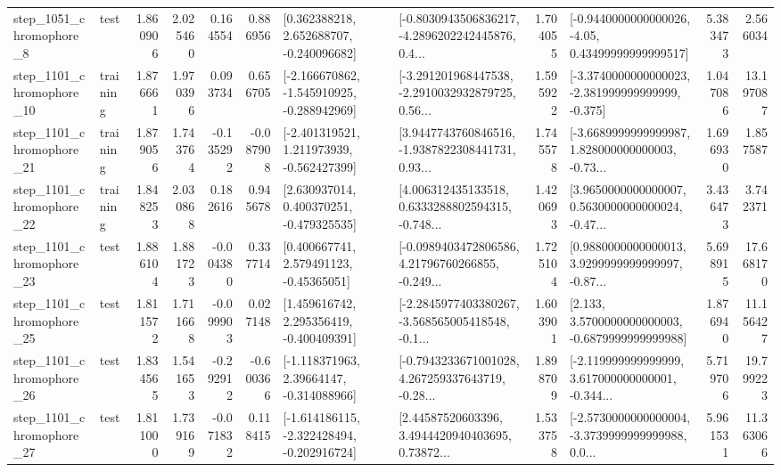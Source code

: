 \begin{tabular}{llrrrrllrlrr}
  step\_1051\_chromophore\_8 &      test &      1.860906 &    2.025460 &      0.164554 &  0.886956 &    [0.362388218, 2.652688707, -0.240096682] &  [-0.8030943506836217, -4.2896202242445876, 0.4... &       1.704055 &  [-0.9440000000000026, -4.05, 0.43499999999999517] &            5.383473 &          2.566034 \\
 step\_1101\_chromophore\_10 &  training &      1.876661 &    1.970396 &      0.093734 &  0.656705 &  [-2.166670862, -1.545910925, -0.288942969] &  [-3.291201968447538, -2.2910032932879725, 0.56... &       1.595922 &  [-3.3740000000000023, -2.381999999999999, -0.375] &            1.047086 &         13.197087 \\
 step\_1101\_chromophore\_21 &  training &      1.879056 &    1.743764 &     -0.135292 & -0.087908 &   [-2.401319521, 1.211973939, -0.562427399] &  [3.9447743760846516, -1.9387822308441731, 0.93... &       1.745578 &  [-3.6689999999999987, 1.828000000000003, -0.73... &            1.696930 &          1.857587 \\
 step\_1101\_chromophore\_22 &  training &      1.848253 &    2.030868 &      0.182616 &  0.945678 &    [2.630937014, 0.400370251, -0.479325535] &  [4.006312435133518, 0.6333288802594315, -0.748... &       1.420693 &  [3.9650000000000007, 0.5630000000000024, -0.47... &            3.436473 &          3.742371 \\
 step\_1101\_chromophore\_23 &      test &      1.886104 &    1.881723 &     -0.004380 &  0.337714 &     [0.400667741, 2.579491123, -0.45365051] &  [-0.0989403472806586, 4.21796760266855, -0.249... &       1.725104 &  [0.9880000000000013, 3.9299999999999997, -0.87... &            5.698915 &         17.668170 \\
 step\_1101\_chromophore\_25 &      test &      1.811572 &    1.711668 &     -0.099903 &  0.027148 &    [1.459616742, 2.295356419, -0.400409391] &  [-2.2845977403380267, -3.568565005418548, -0.1... &       1.603901 &   [2.133, 3.5700000000000003, -0.6879999999999988] &            1.876940 &         11.156427 \\
 step\_1101\_chromophore\_26 &      test &      1.834565 &    1.541653 &     -0.292912 & -0.600366 &    [-1.118371963, 2.39664147, -0.314088966] &  [-0.7943233671001028, 4.267259337643719, -0.28... &       1.898709 &  [-2.119999999999999, 3.617000000000001, -0.344... &            5.719706 &         19.799223 \\
 step\_1101\_chromophore\_27 &      test &      1.811000 &    1.739169 &     -0.071832 &  0.118415 &  [-1.614186115, -2.322428494, -0.202916724] &  [2.44587520603396, 3.4944420940403695, 0.73872... &       1.533758 &  [-2.5730000000000004, -3.3739999999999988, 0.0... &            5.961531 &         11.363066 \\

\end{tabular}
